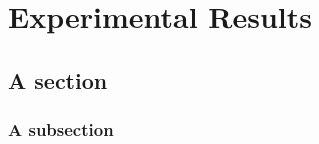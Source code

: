 
\chapter{Experimental Results}\label{chap:Experiments}


\section{A section}


\subsection{A subsection}





